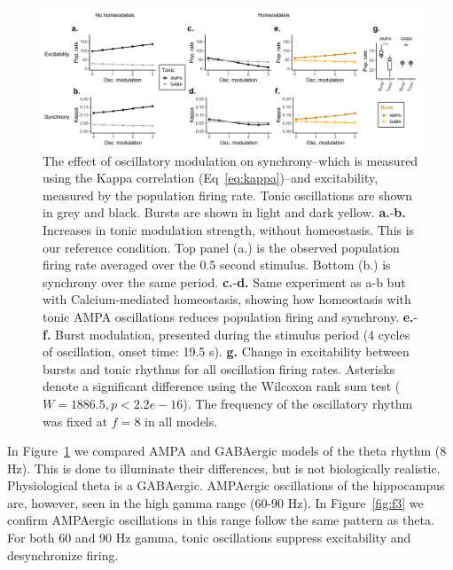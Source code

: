 \documentclass{article}
\begin{document}
\begin{figure}
\centering
\includegraphics[width=1\textwidth]{fig2.png}
\caption{\label{fig:f2}
    The effect of oscillatory modulation on synchrony--which is measured using the Kappa correlation (Eq~\ref{eq:kappa})--and excitability, measured by the population firing rate. Tonic oscillations are shown in grey and black. Bursts are shown in light and dark yellow.
    \textbf{a.}-\textbf{b.} Increases in tonic modulation strength, without homeostasis. This is our reference condition. Top panel (a.) is the observed population firing rate averaged over the 0.5 second stimulus. Bottom (b.) is synchrony over the same period.
    \textbf{c.}-\textbf{d.} Same experiment as a-b but with Calcium-mediated homeostasis, showing how homeostasis with tonic AMPA oscillations reduces population firing and synchrony.
    \textbf{e.}-\textbf{f.} Burst modulation, presented during the stimulus period (4 cycles of oscillation, onset time: 19.5 s).
    \textbf{g.} Change in excitability between bursts and tonic rhythms for all oscillation firing rates. Asterisks denote a significant difference using the Wilcoxon rank sum test ($W = 1886.5, p < 2.2e-16$). The frequency of the oscillatory rhythm was fixed at $f = 8$ in all models.}
\end{figure}

In Figure~\ref{fig:f2} we compared AMPA and GABAergic models of the theta rhythm (8 Hz). This is done to illuminate their differences, but is not biologically realistic. Physiological theta is a GABAergic. AMPAergic oscillations of the hippocampus are, however, seen in the high gamma range (60-90 Hz). In Figure~\ref{fig:f3} we confirm AMPAergic oscillations in this range follow the same pattern as theta. For both 60 and 90 Hz gamma, tonic oscillations suppress excitability and desynchronize firing.
\end{document}
